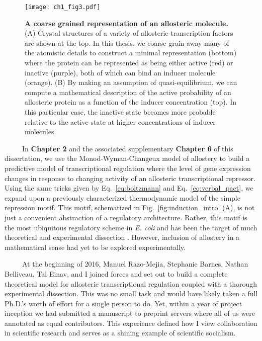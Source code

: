 \documentclass[12pt]{caltech_thesis}
\begin{document}
\hypertarget{fig:allostery}{%
\begin{figure}
\centering
\texttt{[image: ch1\_fig3.pdf]}
\caption[{A coarse grained representation of an allosteric
molecule.}]{\textbf{A coarse grained representation of an allosteric
molecule.} (A) Crystal structures of a variety of allosteric
transcription factors are shown at the top. In this thesis, we coarse
grain away many of the atomistic details to construct a minimal
representation (bottom) where the protein can be represented as being
either active (red) or inactive (purple), both of which can bind an
inducer molecule (orange). (B) By making an assumption of
quasi-equilibrium, we can compute a mathematical description of the
active probability of an allosteric protein as a function of the inducer
concentration (top). In this particular case, the inactive state becomes
more probable relative to the active state at higher concentrations of
inducer molecules.}
\label{fig:allostery}
\end{figure}
}

~~~~~In \textbf{Chapter 2} and the associated supplementary
\textbf{Chapter 6} of this dissertation, we use the Monod-Wyman-Changeux
model of allostery \autocite{monod1965} to build a predictive model of
transcriptional regulation where the level of gene expression changes in
response to changing activity of an allosteric transcriptional
repressor. Using the same tricks given by Eq.~\ref{eq:boltzmann} and
Eq.~\ref{eq:verbal_pact}, we expand upon a previously characterized
thermodynamic model of the simple repression motif. This motif,
schematized in Fig.~\ref{fig:induction_intro} (A), is not just a
convenient abstraction of a regulatory architecture. Rather, this motif
is the most ubiquitous regulatory scheme in \emph{E. coli}
\autocite{gama-castro2016,ireland2020} and has been the target of much
theoretical and experimental dissection
\autocite{vilar2003,buchler2003,bintu2005,garcia2011,brewster2014,phillips2019}.
However, inclusion of allostery in a mathematical sense had yet to be
explored experimentally.

~~~~~At the beginning of 2016, Manuel Razo-Mejia, Stephanie Barnes,
Nathan Belliveau, Tal Einav, and I joined forces and set out to build a
complete theoretical model for allosteric transcriptional regulation
coupled with a thorough experimental dissection. This was no small task
and would have likely taken a full Ph.D.'s worth of effort for a single
person to do. Yet, within a year of project inception we had submitted a
manuscript to preprint servers where all of us were annotated as equal
contributors. This experience defined how I view collaboration in
scientific research and serves as a shining example of scientific
socialism.
\end{document}
